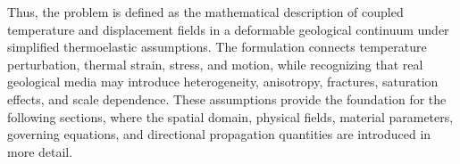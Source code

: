 Thus, the problem is defined as the mathematical description of coupled temperature and displacement fields in a deformable geological continuum under simplified thermoelastic assumptions. The formulation connects temperature perturbation, thermal strain, stress, and motion, while recognizing that real geological media may introduce heterogeneity, anisotropy, fractures, saturation effects, and scale dependence. These assumptions provide the foundation for the following sections, where the spatial domain, physical fields, material parameters, governing equations, and directional propagation quantities are introduced in more detail.